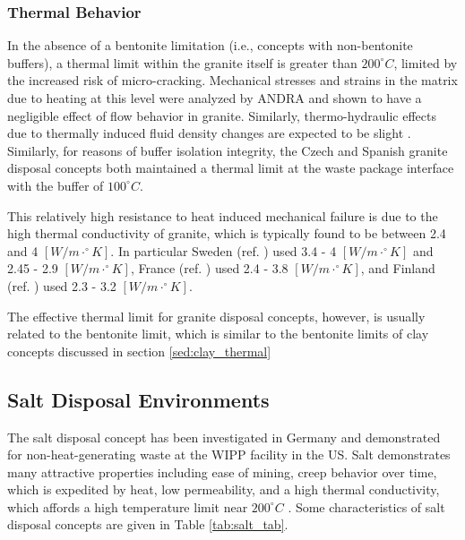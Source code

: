 \subsubsection{Thermal Behavior}
\label{subsec:granitethermal}
In the absence of a bentonite limitation (i.e., concepts with non-bentonite 
buffers), a thermal limit within the granite itself is greater than 
$200^{\circ}C$, limited by the increased risk of micro-cracking.
Mechanical stresses and strains in the matrix due to heating at this 
level were analyzed by \gls{ANDRA} and shown to have a negligible effect of 
flow behavior in granite. Similarly, thermo-hydraulic effects due to thermally
induced fluid density changes are expected to be slight 
\cite{andra_granite:_2005}.
Similarly, for reasons of buffer isolation integrity, the Czech and Spanish
granite disposal concepts both maintained a thermal limit at the waste package
interface with the buffer of $100^{\circ}C$.  \cite{von_lensa_red-impact_2008}

This relatively high resistance to heat  induced mechanical failure is due to the 
high thermal conductivity of granite, which is typically found to be between 
2.4 and 4 $[W/m\cdot^{\circ}K]$.  In particular Sweden (ref. 
\cite{ab_long-term_2006}) used 3.4 - 4 $[W/m\cdot^{\circ}K]$ and 2.45 - 2.9 
$[W/m\cdot^{\circ}K]$,  France (ref.  \cite{andra_argile:_2005}) used 2.4 - 3.8 
$[W/m\cdot^{\circ}K]$, and  Finland (ref. \cite{posiva_interim_2010}) used 2.3 
- 3.2 $[W/m\cdot^{\circ}K]$. 

The effective thermal limit for granite disposal concepts, however, is usually 
related to the bentonite limit, which is similar to the bentonite limits of clay 
concepts discussed in section \ref{sed:clay_thermal}

\subsection{Salt Disposal Environments}

The salt disposal concept has been investigated in Germany and demonstrated for 
non-heat-generating waste at the \gls{WIPP} facility in the US. Salt 
demonstrates many attractive properties including ease of mining, creep behavior 
over time, which is expedited by heat, low permeability, and a high thermal 
conductivity, which affords a high temperature limit near $200^{\circ}C$ 
\cite{hardin_generic_2011}.
Some characteristics of salt disposal 
concepts are given in Table \ref{tab:salt_tab}.   



